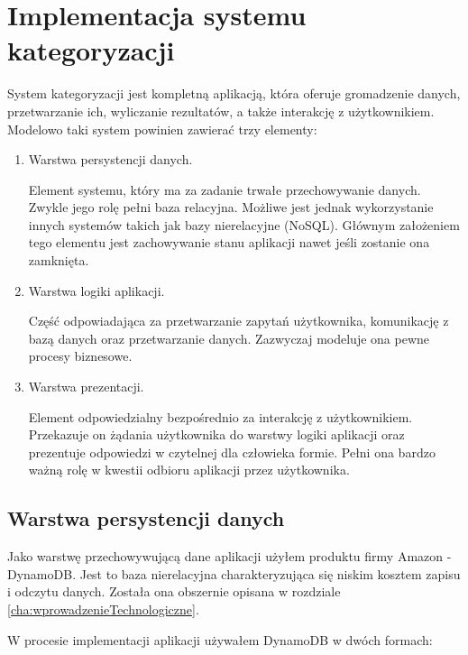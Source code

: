 \chapter{Implementacja systemu kategoryzacji}
\label{cha:implementacja}

System kategoryzacji jest kompletną aplikacją, która oferuje gromadzenie danych, przetwarzanie ich, wyliczanie rezultatów, a także interakcję z użytkownikiem. Modelowo taki system powinien zawierać trzy elementy:
\begin{enumerate}
    \item Warstwa persystencji danych.
    
    Element systemu, który ma za zadanie trwałe przechowywanie danych. Zwykle jego rolę pełni baza relacyjna. Możliwe jest jednak wykorzystanie innych systemów takich jak bazy nierelacyjne (NoSQL). Głównym założeniem tego elementu jest zachowywanie stanu aplikacji nawet jeśli zostanie ona zamknięta.
    
    \item Warstwa logiki aplikacji.
    
    Część odpowiadająca za przetwarzanie zapytań użytkownika, komunikację z bazą danych oraz przetwarzanie danych. Zazwyczaj modeluje ona pewne procesy biznesowe.
    
    \item Warstwa prezentacji.
    
    Element odpowiedzialny bezpośrednio za interakcję z użytkownikiem. Przekazuje on żądania użytkownika do warstwy logiki aplikacji oraz prezentuje odpowiedzi w czytelnej dla człowieka formie. Pełni ona bardzo ważną rolę w kwestii odbioru aplikacji przez użytkownika.
\end{enumerate}

\section{Warstwa persystencji danych}

Jako warstwę przechowywującą dane aplikacji użyłem produktu firmy Amazon - DynamoDB. Jest to baza nierelacyjna charakteryzująca się niskim kosztem zapisu i odczytu danych. Została ona obszernie opisana w rozdziale \ref{cha:wprowadzenieTechnologiczne}.

W procesie implementacji aplikacji używałem DynamoDB w dwóch formach:

